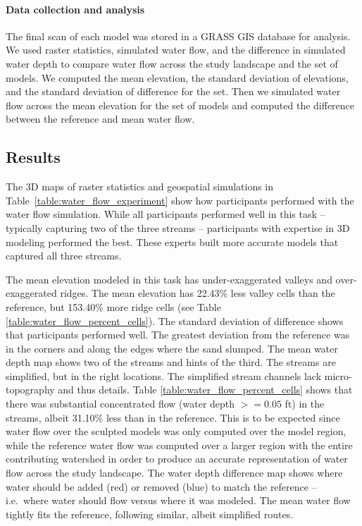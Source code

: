 \documentclass[Afour,sagev,times]{sagej} %
\begin{document}
\paragraph{Data collection and analysis}
The final scan of each model was stored 
in a GRASS GIS database for analysis. 
We used raster statistics, simulated water flow, 
and the difference in simulated water depth 
to compare water flow across the study landscape 
and the set of models.
We computed the mean elevation,
the standard deviation of elevations, 
and the standard deviation of difference for the set.
Then we simulated water flow across 
the mean elevation for the set of models
and computed the difference 
between the reference and mean water flow. 

\subsection{Results}
The 3D maps of raster statistics and geospatial simulations in
Table~\ref{table:water_flow_experiment} 
show how participants performed with the water flow simulation.
While all participants performed well in this task
-- typically capturing two of the three streams -- 
participants with expertise in 3D modeling performed the best.
These experts built more accurate models
that captured all three streams.

The mean elevation modeled in this task
has under-exaggerated valleys and 
over-exaggerated ridges. 
The mean elevation has 22.43\% less valley cells 
than the reference, 
but 153.40\% more ridge cells
(see Table \ref{table:water_flow_percent_cells}). 
The standard deviation of difference 
shows that participants performed well. 
The greatest deviation from the reference
was in the corners and along the edges
where the sand slumped.
The mean water depth map shows two of the streams 
and hints of the third.
The streams are simplified, but in the right locations. 
The simplified stream channels lack micro-topography
and thus details. 
Table \ref{table:water_flow_percent_cells} shows that 
there was substantial concentrated flow (water depth $>=0.05$ ft) 
in the streams, albeit 31.10\% less than in the reference.
This is to be expected since 
water flow over the sculpted models 
was only computed over the model region, while 
the reference water flow 
was computed over a larger region 
with the entire contributing watershed 
in order to produce an accurate representation 
of water flow across the study landscape. 
The water depth difference map shows
where water should be added (red) or removed (blue) 
to match the reference
-- i.e.~where water should flow versus where it was modeled. 
The mean water flow tightly fits the reference, 
following similar, albeit simplified routes.
\end{document}
